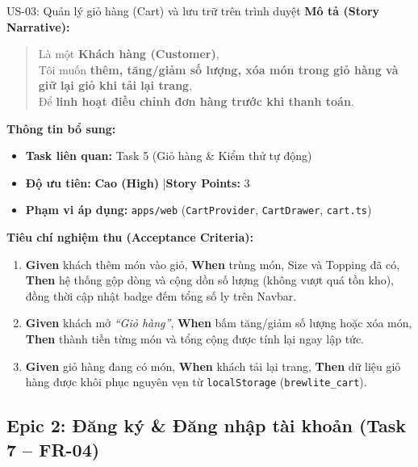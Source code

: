\documentclass[12pt,a4paper]{article}
\begin{document}
\begin{userstorybox}{US-03: Quản lý giỏ hàng (Cart) và lưu trữ trên trình duyệt}
    \textbf{Mô tả (Story Narrative):}
    \begin{quote}
        Là một \textbf{Khách hàng (Customer)},\\
        Tôi muốn \textbf{thêm, tăng/giảm số lượng, xóa món trong giỏ hàng và giữ lại giỏ khi tải lại trang},\\
        Để \textbf{linh hoạt điều chỉnh đơn hàng trước khi thanh toán}.
    \end{quote}

    \textbf{Thông tin bổ sung:}
    \begin{itemize}[noitemsep]
        \item \textbf{Task liên quan:} Task 5 (Giỏ hàng \& Kiểm thử tự động)
        \item \textbf{Độ ưu tiên:} \textcolor{taghigh}{\textbf{Cao (High)}} \quad|\quad \textbf{Story Points:} 3
        \item \textbf{Phạm vi áp dụng:} \texttt{apps/web} (\texttt{CartProvider}, \texttt{CartDrawer}, \texttt{cart.ts})
    \end{itemize}

    \textbf{Tiêu chí nghiệm thu (Acceptance Criteria):}
    \begin{enumerate}[noitemsep]
        \item \textbf{Given} khách thêm món vào giỏ, \textbf{When} trùng món, Size và Topping đã có, \textbf{Then} hệ thống gộp dòng và cộng dồn số lượng (không vượt quá tồn kho), đồng thời cập nhật badge đếm tổng số ly trên Navbar.
        \item \textbf{Given} khách mở \textit{``Giỏ hàng''}, \textbf{When} bấm tăng/giảm số lượng hoặc xóa món, \textbf{Then} thành tiền từng món và tổng cộng được tính lại ngay lập tức.
        \item \textbf{Given} giỏ hàng đang có món, \textbf{When} khách tải lại trang, \textbf{Then} dữ liệu giỏ hàng được khôi phục nguyên vẹn từ \texttt{localStorage} (\texttt{brewlite\_cart}).
    \end{enumerate}
\end{userstorybox}

\vspace{0.4cm}

\subsection{Epic 2: Đăng ký \& Đăng nhập tài khoản (Task 7 -- FR-04)}
\end{document}
